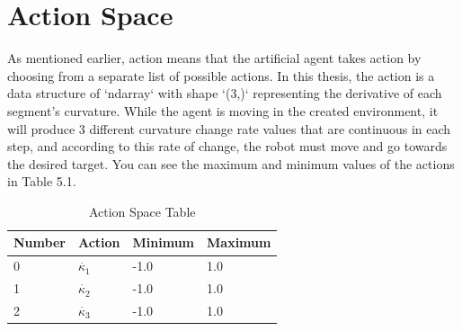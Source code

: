 \documentclass[12pt,twoside,a4]{mwbk}
\begin{document}
\section{Action Space}
As mentioned earlier, action means that the artificial agent takes action by choosing from a separate list of possible actions. In this thesis, the action is a data structure of `ndarray` with shape `(3,)` representing the derivative of each segment's curvature. While the agent is moving in the created environment, it will produce 3 different curvature change rate values that are continuous in each step, and according to this rate of change, the robot must move and go towards the desired target. You can see the maximum and minimum values of the actions in Table 5.1. 
\begin{table}[h!]
\centering
\begin{tabular}{||c c c c||} 
 \hline \hline
 \textbf{Number} & \textbf{Action} & \textbf{Minimum} & \textbf{Maximum} \\ [0.5ex] 
    \hline\hline
    \multicolumn{1}{|l|}{0} & \multicolumn{1}{l|}{$\dot{\kappa_1}$} & \multicolumn{1}{l|}{-1.0} & \multicolumn{1}{l|}{1.0} \\ \hline
    \multicolumn{1}{|l|}{1} & \multicolumn{1}{l|}{$\dot{\kappa_2}$} & \multicolumn{1}{l|}{-1.0} & \multicolumn{1}{l|}{1.0} \\ \hline
    \multicolumn{1}{|l|}{2} & \multicolumn{1}{l|}{$\dot{\kappa_3}$} & \multicolumn{1}{l|}{-1.0} & \multicolumn{1}{l|}{1.0} \\ 
    \hline
\end{tabular}
\caption{Action Space Table}
\end{table}
\end{document}
